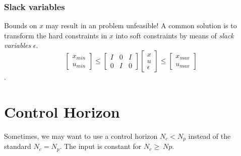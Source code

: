 \documentclass[a4paper,12pt,fleqn]{book}
\newcommand{\slack}{\epsilon}
\newcommand{\Np}{{N_p}}
\newcommand{\Nc}{{N_c}}
\begin{document}
\subsubsection{Slack variables}
Bounds on $x$ may result in an problem unfeasible! A common solution
is to transform the hard constraints in $x$ into soft constraints by means of  \emph{slack variables} $\slack$.
\begin{equation}
\begin{bmatrix}
 x_{min}\\u_{min}
\end{bmatrix}
\leq
\begin{bmatrix}
 I &0 &I\\
 0 &I & 0
\end{bmatrix}
\begin{bmatrix}
 x\\
 u\\
 \slack
\end{bmatrix}
\leq
\begin{bmatrix}
 x_{max}\\u_{max}
\end{bmatrix}
\end{equation}.

\section{Control Horizon}
Sometimes, we may want to use a control horizon $\Nc < \Np$ instead of the standard $\Nc = \Np$. The input is constant for $\Nc \geq \ Np$.
\end{document}
